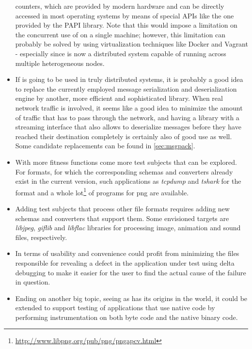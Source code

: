 \begin{itemize}
counters, which are provided by modern hardware and can be directly accessed in most operating systems by
means of special APIs like the one provided by the {\small PAPI}\cite{Mucci99papi:a} library. Note that
this would impose a limitation on the concurrent use of \xmlmate on a single machine; however, this limitation
can probably be solved by using virtualization techniques like {\small Docker}\cite{docker} and {\small
Vagrant}\cite{vagrant} - especially since \xmlmate is now a distributed system capable of running across
multiple heterogeneous nodes.
\item[]If \xmlmate is going to be used in truly distributed systems, it is probably a good idea to replace
the currently employed \msgpack message serialization and deserialization engine by another, more efficient and
sophisticated library. When real network traffic is involved, it seems like a good idea to minimize the amount
of traffic that has to pass through the network, and having a library with a streaming interface that also
allows to deserialize messages before they have reached their destination completely is certainly also of
good use as well. Some candidate replacements can be found in \cref{sec:msgpack}.
\item[]With more fitness functions come more test subjects that can be explored. For formats, for which the
corresponding schemas and converters already exist in the current version, such applications as \emph{tcpdump}
and \emph{tshark} for the \pcap format and a whole
lot\footnote{\url{http://www.libpng.org/pub/png/pngapcv.html}} of programs for {\small png} are available.
\item[]Adding test subjects that process other file formats requires adding new schemas and converters that
support them. Some envisioned targets are \emph{libjpeg}, \emph{giflib} and \emph{libflac} libraries for
processing image, animation and sound files, respectively.
\item[]In terms of usability and convenience \xmlmate could profit from minimizing the files responsible for
revealing a defect in the application under test using delta debugging\cite{zeller2002simplifying} to make it
easier for the user to find the actual cause of the failure in question.
\item[]Ending on another big topic, seeing as \xmlmate has its origins in the \java world, it could be extended
to support testing of \java applications that use native code by performing instrumentation on both \java
byte code and the native binary code.
\end{itemize}


